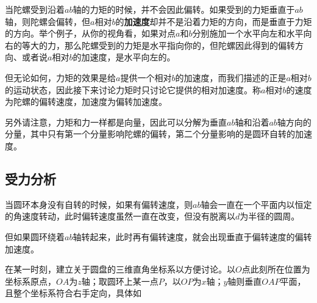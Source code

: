 当陀螺受到沿着$ab$轴的力矩的时候，并不会因此偏转。如果受到的力矩垂直于$ab$轴，则陀螺会偏转，但$a$相对$b$的\textbf{加速度}却并不是沿着力矩的方向，而是垂直于力矩的方向。举个例子，从你的视角看，如果对点$a$和$b$分别施加一个水平向左和水平向右的等大的力，那么陀螺受到的力矩是水平指向你的，但陀螺因此得到的偏转方向、或者说$a$相对$b$的加速度，是水平向左的。



但无论如何，力矩的效果是给$a$提供一个相对$b$的加速度，而我们描述的正是$a$相对$b$的运动状态，因此接下来讨论力矩时只讨论它提供的相对加速度。称$a$相对$b$的速度为陀螺的偏转速度，加速度为偏转加速度。

另外请注意，力矩和力一样都是向量，因此可以分解为垂直$ab$轴和沿着$ab$轴方向的分量，其中只有第一个分量影响陀螺的偏转，第二个分量影响的是圆环自转的加速度。




\subsection{受力分析}



当圆环本身没有自转的时候，如果有偏转速度，则$ab$轴会一直在一个平面内以恒定的角速度转动，此时偏转速度虽然一直在改变，但没有脱离以$d$为半径的圆周。

但如果圆环绕着$ab$轴转起来，此时再有偏转速度，就会出现垂直于偏转速度的偏转加速度。


在某一时刻，建立关于圆盘的三维直角坐标系以方便讨论。以$O$点此刻所在位置为坐标系原点，$OA$为$z$轴；取圆环上某一点$P$，以$OP$为$x$轴；$y$轴则垂直$OAP$平面，且整个坐标系符合右手定向，具体如




























